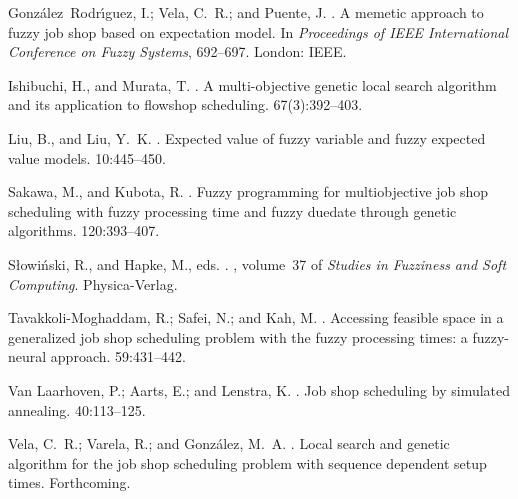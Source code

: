 \documentclass[letterpaper]{article}
\begin{document}
\begin{thebibliography}{}
Gonz\'alez~Rodr\'{\i}guez, I.; Vela, C.~R.; and Puente, J.
.
\newblock A memetic approach to fuzzy job shop based on expectation model.
\newblock In {\em Proceedings of IEEE International Conference on Fuzzy
  Systems},  692--697.
\newblock London: IEEE.

Ishibuchi, H., and Murata, T.
.
\newblock A multi-objective genetic local search algorithm and its application
  to flowshop scheduling.
 67(3):392--403.

Liu, B., and Liu, Y.~K.
.
\newblock Expected value of fuzzy variable and fuzzy expected value models.
 10:445--450.

Sakawa, M., and Kubota, R.
.
\newblock Fuzzy programming for multiobjective job shop scheduling with fuzzy
  processing time and fuzzy duedate through genetic algorithms.
 120:393--407.

S{\l}owi\'nski, R., and Hapke, M., eds.
.
, volume~37 of {\em Studies in
  Fuzziness and Soft Computing}.
\newblock Physica-Verlag.

Tavakkoli-Moghaddam, R.; Safei, N.; and Kah, M.
.
\newblock Accessing feasible space in a generalized job shop scheduling problem
  with the fuzzy processing times: a fuzzy-neural approach.
 59:431--442.

{Van Laarhoven}, P.; Aarts, E.; and Lenstra, K.
.
\newblock Job shop scheduling by simulated annealing.
 40:113--125.

Vela, C.~R.; Varela, R.; and Gonz\'alez, M.~A.
.
\newblock Local search and genetic algorithm for the job shop scheduling
  problem with sequence dependent setup times.
 Forthcoming.

\end{thebibliography}
\end{document}
